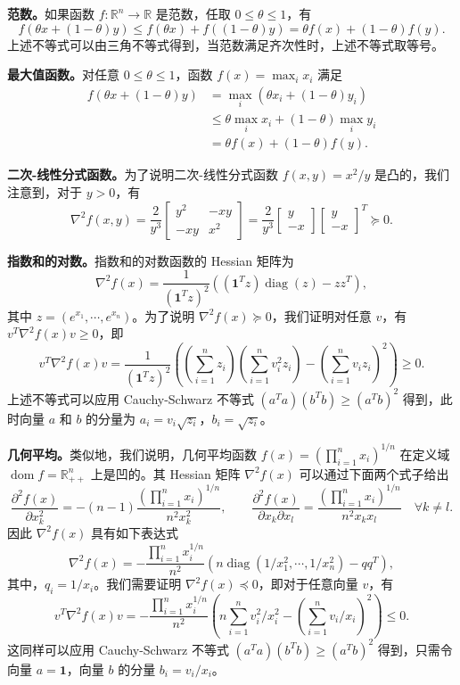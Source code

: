 \documentclass[UTF8,12pt,a4paper,fontset=fandol]{ctexart}
\DeclareMathOperator{\dom}{dom}
\DeclareMathOperator{\diag}{diag}
\begin{document}
\noindent\textbf{范数。}\quad 如果函数 $f:\mathbb{R}^n\to\mathbb{R}$ 是范数，任取 $0\leq\theta\leq1$，有
\[
f(\theta x+(1-\theta)y)\leq f(\theta x)+f((1-\theta)y)=\theta f(x)+(1-\theta)f(y).
\]
上述不等式可以由三角不等式得到，当范数满足齐次性时，上述不等式取等号。

\noindent\textbf{最大值函数。}\quad 对任意 $0\leq\theta\leq1$，函数 $f(x)=\max_i x_i$ 满足
\[
\begin{aligned}
f(\theta x+(1-\theta)y)
&=\max_i(\theta x_i+(1-\theta)y_i)\\
&\leq \theta\max_i x_i+(1-\theta)\max_i y_i\\
&=\theta f(x)+(1-\theta)f(y).
\end{aligned}
\]

\noindent\textbf{二次-线性分式函数。}\quad 为了说明二次-线性分式函数 $f(x,y)=x^2/y$ 是凸的，我们注意到，对于 $y>0$，有
\[
\nabla^2 f(x,y)=\frac{2}{y^3}
\begin{bmatrix}
y^2 & -xy\\
-xy & x^2
\end{bmatrix}
=\frac{2}{y^3}
\begin{bmatrix}
y\\
-x
\end{bmatrix}
\begin{bmatrix}
y\\
-x
\end{bmatrix}^T\succeq0.
\]

\noindent\textbf{指数和的对数。}\quad 指数和的对数函数的 Hessian 矩阵为
\[
\nabla^2 f(x)=\frac{1}{(\mathbf{1}^Tz)^2}\left((\mathbf{1}^Tz)\diag(z)-zz^T\right),
\]
其中 $z=(e^{x_1},\cdots,e^{x_n})$。为了说明 $\nabla^2 f(x)\succeq0$，我们证明对任意 $v$，有 $v^T\nabla^2 f(x)v\geq0$，即
\[
v^T\nabla^2 f(x)v
=\frac{1}{(\mathbf{1}^Tz)^2}\left(\left(\sum_{i=1}^n z_i\right)\left(\sum_{i=1}^n v_i^2z_i\right)-\left(\sum_{i=1}^n v_iz_i\right)^2\right)\geq0.
\]
上述不等式可以应用 Cauchy-Schwarz 不等式 $(a^Ta)(b^Tb)\geq(a^Tb)^2$ 得到，此时向量 $a$ 和 $b$ 的分量为 $a_i=v_i\sqrt{z_i}$，$b_i=\sqrt{z_i}$。

\noindent\textbf{几何平均。}\quad 类似地，我们说明，几何平均函数 $f(x)=\left(\prod_{i=1}^n x_i\right)^{1/n}$ 在定义域 $\dom f=\mathbb{R}_{++}^n$ 上是凹的。其 Hessian 矩阵 $\nabla^2 f(x)$ 可以通过下面两个式子给出
\[
\frac{\partial^2 f(x)}{\partial x_k^2}=-(n-1)\frac{\left(\prod_{i=1}^n x_i\right)^{1/n}}{n^2x_k^2},\qquad
\frac{\partial^2 f(x)}{\partial x_k\partial x_l}=
\frac{\left(\prod_{i=1}^n x_i\right)^{1/n}}{n^2x_kx_l}\quad \forall k\neq l.
\]
因此 $\nabla^2 f(x)$ 具有如下表达式
\[
\nabla^2 f(x)=-\frac{\prod_{i=1}^n x_i^{1/n}}{n^2}\left(n\diag(1/x_1^2,\cdots,1/x_n^2)-qq^T\right),
\]
其中，$q_i=1/x_i$。我们需要证明 $\nabla^2 f(x)\preceq0$，即对于任意向量 $v$，有
\[
v^T\nabla^2 f(x)v
=-\frac{\prod_{i=1}^n x_i^{1/n}}{n^2}\left(n\sum_{i=1}^n v_i^2/x_i^2-\left(\sum_{i=1}^n v_i/x_i\right)^2\right)\leq0.
\]
这同样可以应用 Cauchy-Schwarz 不等式 $(a^Ta)(b^Tb)\geq(a^Tb)^2$ 得到，只需令向量 $a=\mathbf{1}$，向量 $b$ 的分量 $b_i=v_i/x_i$。
\end{document}

